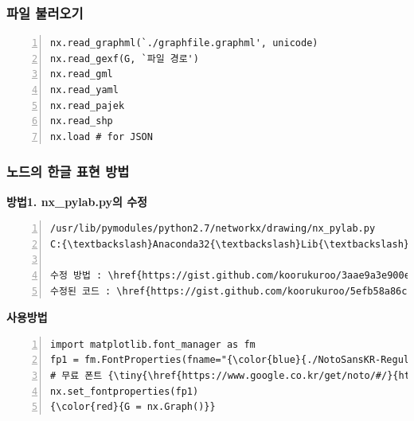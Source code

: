 \documentclass{beamer}
\begin{document}
\begin{frame}[fragile]
\frametitle{파일 불러오기}
\begin{block}{}
\begin{Verbatim}[numbers=left,commandchars=\\\{\}]
nx.read_graphml(`./graphfile.graphml', unicode)
nx.read_gexf(G, `파일 경로')
nx.read_gml
nx.read_yaml
nx.read_pajek
nx.read_shp
nx.load # for JSON
\end{Verbatim}
\end{block}
\end{frame}



\begin{frame}[fragile]
\frametitle{노드의 한글 표현 방법}
\textbf{방법1. nx\_pylab.py의 수정}
\scriptsize
\begin{Verbatim}[numbers=left,commandchars=\\\{\}]
/usr/lib/pymodules/python2.7/networkx/drawing/nx_pylab.py
C:{\textbackslash}Anaconda32{\textbackslash}Lib{\textbackslash}site-packages{\textbackslash}networkx{\textbackslash}drawing{\textbackslash}nx_pylab.py

수정 방법 : \href{https://gist.github.com/koorukuroo/3aae9a3e900e868840ea}{https://gist.github.com/koorukuroo/3aae9a3e900e868840ea}
수정된 코드 : \href{https://gist.github.com/koorukuroo/5efb58a86c5396f13650}{https://gist.github.com/koorukuroo/5efb58a86c5396f13650}
\end{Verbatim}
\vspace{5mm}
\scriptsize
\textbf{사용방법}
\begin{Verbatim}[numbers=left,commandchars=\\\{\}]
import matplotlib.font_manager as fm
fp1 = fm.FontProperties(fname="{\color{blue}{./NotoSansKR-Regular.otf}}") 
# 무료 폰트 {\tiny{\href{https://www.google.co.kr/get/noto/#/}{https://www.google.com/get/noto/pkgs/NotoSansKorean-windows.zip}}}
nx.set_fontproperties(fp1)
{\color{red}{G = nx.Graph()}}
\end{Verbatim}
\end{frame}
\end{document}
